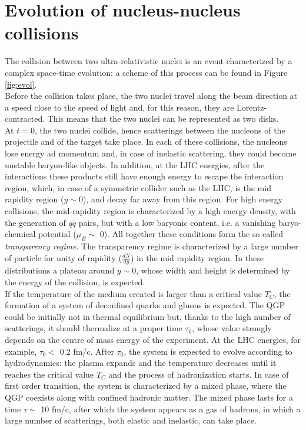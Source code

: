 \section{Evolution of nucleus-nucleus collisions}
The collision between two ultra-relativistic nuclei is an event characterized by a complex space-time evolution: a scheme of this process can be found in Figure \ref{fig:evol}.\\
Before the collision takes place, the two nuclei travel along the beam direction at a speed close to the speed of light and, for this reason, they are Lorentz-contracted. This means that the two nuclei can be represented as two disks.\\
At $t=0$, the two nuclei collide, hence scatterings between the nucleons of the projectile and of the target take place. In each of these collisions, the nucleons lose energy ad momentum and, in case of inelastic scattering, they could become unstable baryon-like objects. In addition, at the LHC energies, after the interactions these products still have enough energy to escape the interaction region, which, in case of a symmetric collider such as the LHC, is the mid rapidity region ($y\sim0$), and decay far away from this region. For high energy collisions, the mid-rapidity region is characterized by a high energy density, with the generation of $q\bar{q}$ pairs, but with a low baryonic content, i.e. a vanishing baryo-chemical potential ($\mu_{B}\sim$ 0). All together these conditions form the so called \textit{transparency regime}. The transparency regime is characterized by a large number of particle for unity of rapidity ($\frac{dN}{dy}$) in the mid rapidity region. In these distributions a plateau around $y\sim0$, whose width and height is determined by the energy of the collision, is expected.\\
If the temperature of the medium created is larger than a critical value $T_{C}$, the formation of a system of deconfined quarks and gluons is expected. The QGP could be initially not in thermal equilibrium but, thanks to the high number of scatterings, it should thermalize at a proper time $\tau_{0}$, whose value strongly depends on the centre of mass energy of the experiment. At the LHC energies, for example, $\tau_{0}<$ 0.2 fm/c. After $\tau_{0}$, the system is expected to evolve according to hydrodynamics: the plasma expands and the temperature decreases until it reaches the critical value $T_{C}$ and the process of hadronization starts. In case of first order transition, the system is characterized by a mixed phase, where the QGP coexists along with confined hadronic matter. The mixed phase lasts for a time $\tau\sim$ 10 fm/c, after which the system appears as a gas of hadrons, in which a large number of scatterings, both elastic and inelastic, can take place.
